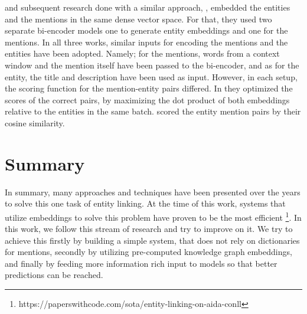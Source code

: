 \cite{Gillick2019} and subsequent research done with a similar approach, \cite{Wu2020}, embedded the entities and the mentions in the same dense vector space. For that, they used two separate bi-encoder models one to generate entity embeddings and one for the mentions. In all three works, similar inputs for encoding the mentions and the entities have been adopted. Namely; for the mentions, words from a context window and the mention itself have been passed to the bi-encoder, and as for the entity, the title and description have been used as input. However, in each setup, the scoring function for the mention-entity pairs differed.\newline
In \cite{Wu2020} they optimized the scores of the correct pairs, by maximizing the dot product of both embeddings relative to the entities in the same batch. \cite{Gillick2019} scored the entity mention pairs by their cosine similarity.

\section{Summary}
In summary, many approaches and techniques have been presented over the years to solve this one task of entity linking. At the time of this work, systems that utilize embeddings to solve this problem have proven to be the most efficient \footnote{https://paperswithcode.com/sota/entity-linking-on-aida-conll}. In this work, we follow this stream of research and try to improve on it. We try to achieve this firstly by building a simple system, that does not rely on dictionaries for mentions, secondly by utilizing pre-computed knowledge graph embeddings, and finally by feeding more information rich input to models so that better predictions can be reached.

